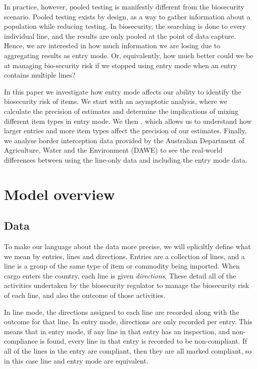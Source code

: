 \documentclass{article}
\begin{document}
In practice, however, pooled testing is manifestly different from the biosecurity scenario. Pooled testing exists by design, as a way to gather information about a population while reducing testing. In biosecurity, the searching is done to every individual line, and the results are only pooled at the point of data capture. Hence, we are interested in how much information we are losing due to aggregating results as entry mode. Or, equivalently, how much better could we be at managing bio-security risk if we stopped using entry mode when an entry contains multiple lines?

In this paper we investigate how entry mode affects our ability to identify the biosecurity risk of items. We start with an asymptotic analysis, where we calculate the precision of estimates and determine the implications of mixing different item types in entry mode. We then  , which allows us to understand how larger entries and more item types affect the precision of our estimates. Finally, we analyse border interception data provided by the Australian Department of Agriculture, Water and the Environment (DAWE) to see the real-world differences between using the line-only data and including the entry mode data.
\section{Model overview}
\subsection{Data}\label{sec:data}

To make our language about the data more precise, we will epliciltly define what we mean by entries, lines and directions. Entries are a collection of lines, and a line is a group of the same type of item or commodity being imported. When cargo enters the country, each line is given \emph{directions}. These detail all of the activities undertaken by the biosecurity regulator to manage the biosecurity risk of each line, and also the outcome of those activities.

In line mode, the directions assigned to each line are recorded along with the outcome for that line. In entry mode, directions are only recorded per entry. This means that in entry mode, if any line in that entry has an inspection, and non-compliance is found, every line in that entry is recorded to be non-compliant. If all of the lines in the entry are compliant, then they are all marked compliant, so in this case line and entry mode are equivalent.
\end{document}
